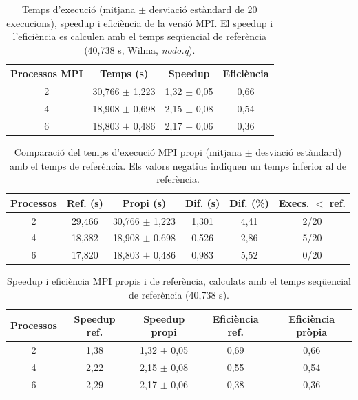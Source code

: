 \begin{table}[H]
\centering
\begin{tabular}{|c|c|c|c|}
\hline
\textbf{Processos MPI} & \textbf{Temps (s)} & \textbf{Speedup} & \textbf{Eficiència} \\ \hline
2 & 30,766 $\pm$ 1,223 & 1,32 $\pm$ 0,05 & 0,66 \\ \hline
4 & 18,908 $\pm$ 0,698 & 2,15 $\pm$ 0,08 & 0,54 \\ \hline
6 & 18,803 $\pm$ 0,486 & 2,17 $\pm$ 0,06 & 0,36 \\ \hline
\end{tabular}
\caption{Temps d'execució (mitjana $\pm$ desviació estàndard de 20 execucions), speedup i eficiència de la versió MPI. El speedup i l'eficiència es calculen amb el temps seqüencial de referència (40,738 s, Wilma, \textit{nodo.q}).}
\label{tab:mpi_resultats}
\end{table}

\begin{table}[H]
\centering
\begin{tabular}{|c|c|c|c|c|c|}
\hline
\textbf{Processos} & \textbf{Ref. (s)} & \textbf{Propi (s)} & \textbf{Dif. (s)} & \textbf{Dif. (\%)} & \textbf{Execs. $<$ ref.} \\ \hline
2 & 29,466 & 30,766 $\pm$ 1,223 & 1,301 & 4,41 & 2/20 \\ \hline
4 & 18,382 & 18,908 $\pm$ 0,698 & 0,526 & 2,86 & 5/20 \\ \hline
6 & 17,820 & 18,803 $\pm$ 0,486 & 0,983 & 5,52 & 0/20 \\ \hline
\end{tabular}
\caption{Comparació del temps d'execució MPI propi (mitjana $\pm$ desviació estàndard) amb el temps de referència. Els valors negatius indiquen un temps inferior al de referència.}
\label{tab:mpi_comp_temps}
\end{table}

\begin{table}[H]
\centering
\begin{tabular}{|c|c|c|c|c|}
\hline
\textbf{Processos} & \textbf{Speedup ref.} & \textbf{Speedup propi} & \textbf{Eficiència ref.} & \textbf{Eficiència pròpia} \\ \hline
2 & 1,38 & 1,32 $\pm$ 0,05 & 0,69 & 0,66 \\ \hline
4 & 2,22 & 2,15 $\pm$ 0,08 & 0,55 & 0,54 \\ \hline
6 & 2,29 & 2,17 $\pm$ 0,06 & 0,38 & 0,36 \\ \hline
\end{tabular}
\caption{Speedup i eficiència MPI propis i de referència, calculats amb el temps seqüencial de referència (40,738 s).}
\label{tab:mpi_comp_speedup}
\end{table}
